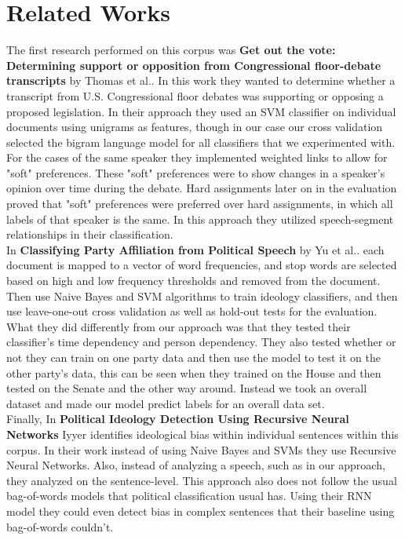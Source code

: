 \documentclass[a4paper, 12pt]{article}
\begin{document}
\section{Related Works}
\label{gen_inst}
The first research performed on this corpus was \cite{thomas2006get} \textbf{Get out the vote: Determining support or opposition from Congressional floor-debate transcripts} by Thomas et al.. In this work they wanted to determine whether a transcript from U.S. Congressional floor debates was supporting or opposing a proposed legislation. In their approach they used an SVM classifier on individual documents using unigrams as features, though in our case our cross validation selected the bigram language model for all classifiers that we experimented with. For the cases of the same speaker they implemented weighted links to allow for "soft" preferences. These "soft" preferences were to show changes in a speaker's opinion over time during the debate. Hard assignments later on in the evaluation proved that "soft" preferences were preferred over hard assignments, in which all labels of that speaker is the same. In this approach they utilized speech-segment relationships in their classification. \\

\noindent	
In \cite{yu2008classifying} \textbf{Classifying Party Affiliation from Political Speech} by Yu et al.. each document is mapped to a vector of word frequencies, and stop words are selected based on high and low frequency thresholds and removed from the document. Then use Naive Bayes and SVM algorithms to train ideology classifiers, and then use leave-one-out cross validation as well as hold-out tests for the evaluation. What they did differently from our approach was that they tested their classifier's time dependency and person dependency. They also tested whether or not they can train on one party data and then use the model to test it on the other party's data, this can be seen when they trained on the House and then tested on the Senate and the other way around. Instead we took an overall dataset and made our model predict labels for an overall data set.\\

\noindent
Finally, In  \cite{iyyer2014political} \textbf{Political Ideology Detection Using Recursive Neural Networks} Iyyer identifies ideological bias within individual sentences within this corpus. In their work instead of using Naive Bayes and SVMs they use Recursive Neural Networks. Also, instead of analyzing a speech, such as in our approach, they analyzed on the sentence-level. This approach also does not follow the usual bag-of-words models that political classification usual has. Using their RNN model they could even detect bias in complex sentences that their baseline using bag-of-words couldn't. 
	
\end{document}
